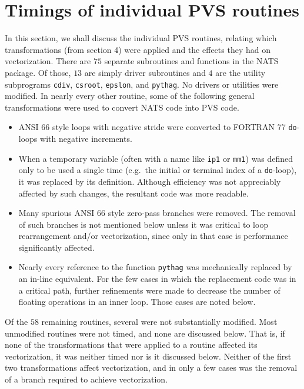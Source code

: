 \section{Timings of individual PVS routines}
In this section, we shall discuss the individual PVS routines, relating
which transformations (from section 4) were applied and the effects
they had on vectorization.
There are $75$ separate subroutines and functions in the NATS package.
Of those, $13$ are simply driver subroutines and $4$ are the utility
subprograms {\tt cdiv}, {\tt csroot}, {\tt epslon}, and {\tt pythag}.
No drivers or utilities were modified.
In nearly every other routine, some of the following general transformations
were used to convert NATS code into PVS code.
\begin{itemize}
 \item ANSI 66 style loops with negative stride were converted to FORTRAN 77
    {\tt do}-loops with negative increments.
 \item When a temporary variable (often with a name like {\tt ip1} or {\tt mm1})
    was defined only to be used a single time (e.g.\ the initial or
    terminal index of a {\tt do}-loop), it was replaced by its definition.
    Although efficiency was not appreciably affected by such changes,
    the resultant code was more readable.
 \item Many spurious ANSI 66 style zero-pass branches were removed.
    The removal of such branches is not mentioned below unless it was
    critical to loop rearrangement and/or vectorization, since only in
    that case is performance significantly affected.
 \item Nearly every reference to the function {\tt pythag} was mechanically
    replaced by an in-line equivalent.  For the few cases in which the
    replacement code was in a critical path, further refinements were
    made to decrease the number of floating operations in an inner loop.
    Those cases are noted below.
\end{itemize}
Of the $58$ remaining routines, several were not substantially modified.
Most unmodified routines were not timed, and none are discussed below.
That is, if none of the transformations that were applied to a routine
affected its vectorization, it was neither timed nor is it discussed below.
Neither of the first two transformations affect vectorization, and in only
a few cases was the removal of a branch required to achieve vectorization.

